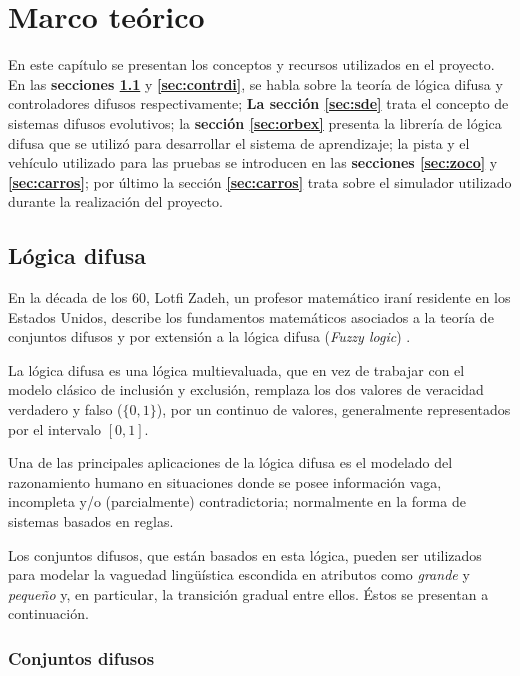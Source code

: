 \chapter{Marco teórico}

En este capítulo se presentan los conceptos y recursos utilizados en el proyecto. En las \textbf{secciones \ref{sec:ld}} y \textbf{\ref{sec:contrdi}}, se habla sobre la teoría de lógica difusa y controladores difusos respectivamente; \textbf{La sección \ref{sec:sde}} trata el concepto de sistemas difusos evolutivos; la \textbf{sección \ref{sec:orbex}} presenta la librería de lógica difusa que se utilizó para desarrollar el sistema de aprendizaje; la pista y el vehículo utilizado para las pruebas se introducen en las \textbf{secciones \ref{sec:zoco}} y \textbf{\ref{sec:carros}}; por último la sección \textbf{\ref{sec:carros}} trata sobre el simulador utilizado durante la realización del proyecto.   

\section{Lógica difusa} 
\label{sec:ld}
En la década de los 60, Lotfi Zadeh, un profesor matemático iraní residente en los Estados Unidos, describe los fundamentos matemáticos asociados a la teoría de conjuntos difusos y por extensión a la lógica difusa (\textit{Fuzzy logic}) \cite{zadeh1965fuzzy}.

La lógica difusa es una lógica multievaluada, que en vez de trabajar con el modelo clásico de inclusión y exclusión, remplaza los dos valores de veracidad verdadero y falso ($\{0,1\}$), por un continuo de valores, generalmente representados por el intervalo $[0,1]$. 

Una de las principales aplicaciones de la lógica difusa es el modelado del razonamiento humano en situaciones donde se posee información vaga, incompleta y/o (parcialmente) contradictoria; normalmente en la forma de sistemas basados en reglas. 

Los conjuntos difusos, que están basados en esta lógica, pueden ser utilizados para modelar la vaguedad lingüística escondida en atributos como \textit{grande} y \textit{pequeño} y, en particular, la transición gradual entre ellos. Éstos se presentan a continuación.


\subsection{Conjuntos difusos}
\label{sec:cd}

